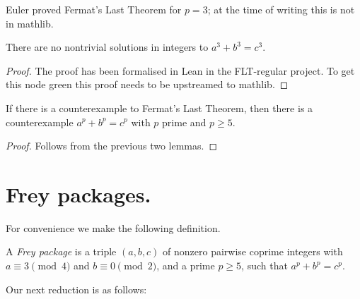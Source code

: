Euler proved Fermat's Last Theorem for $p=3$; at the time of writing this is not in mathlib.

\begin{lemma}\label{p_not_three}
  There are no nontrivial solutions in integers to $a^3+b^3=c^3$.
\end{lemma}
\begin{proof}
  The proof has been formalised in Lean in the FLT-regular project. To get this node green
  this proof needs to be upstreamed to mathlib.
\end{proof}

\begin{corollary}\label{WLOG_p_ge_5} If there is a counterexample to Fermat's Last Theorem,
  then there is a counterexample $a^p+b^p=c^p$ with $p$ prime and $p\geq 5$.
\end{corollary}
\begin{proof} Follows from the previous two lemmas.\end{proof}

\section{Frey packages.}

For convenience we make the following definition.

\begin{definition} A \emph{Frey package} is a triple $(a,b,c)$ of nonzero pairwise coprime integers with $a\equiv3\pmod4$ and $b\equiv0\pmod2$, and a prime $p\geq5$, such that $a^p+b^p=c^p$.\end{definition}

Our next reduction is as follows:

